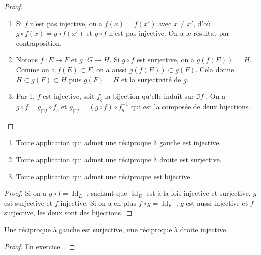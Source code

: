 \begin{proof}
\par\noindent
\begin{enumerate}
\item Si \(𝑓\) n'est pas injective, on a \(𝑓(𝑥)=𝑓(𝑥')\) avec \(𝑥≠𝑥'\),
d'où \(𝑔∘𝑓(𝑥)=𝑔∘𝑓(𝑥')\) et \(𝑔∘𝑓\)
n'est pas injective. On a le résultat par contraposition.
\item Notons \(𝑓~:𝐸→𝐹\) et \(𝑔~:𝐺→𝐻\). Si \(𝑔∘𝑓\) est surjective, on a \(𝑔(𝑓(𝐸))~=𝐻\).
Comme on a \(𝑓(𝐸)⊂𝐹\), on a aussi \(𝑔(𝑓(𝐸))⊂𝑔(𝐹)\).
Cela donne \(𝐻⊂𝑔(𝐹)⊂𝐻\) puis \(𝑔(𝐹)=𝐻\) et la surjectivité de \(𝑔\).
\item Par 1, \(𝑓\) est injective, soit \(𝑓_b\) la bijection qu'elle induit sur \(\Im 𝑓\) . On a \(𝑔∘𝑓=𝑔_{\left|\Im
𝑓\right.}∘𝑓_b\) et \(𝑔_{\left|\Im 𝑓\right.}=(𝑔∘𝑓)∘𝑓_b^{-1}\) qui est la composée de deux bijections.
\end{enumerate}
\end{proof}
%
\begin{theorem}
\begin{enumerate}
\item Toute application qui admet une réciproque à gauche est injective.
\item Toute application qui admet une réciproque à droite est surjective.
\item Toute application qui admet une réciproque est bijective.
\end{enumerate}
\end{theorem}
\begin{proof}
Si on a \(𝑔∘𝑓=\operatorname{Id}_{𝐸}\) , sachant que \(\operatorname{Id}_{𝐸}\) est à la fois injective et surjective,
\(𝑔\) est surjective et \(𝑓\) injective. Si on a en plus \(𝑓∘𝑔=\operatorname{Id}_{𝐹}\) , \(𝑔\) est aussi injective et
 \(𝑓\) surjective, les deux sont des bijections.
\end{proof}
\begin{theorem}
Une réciproque à gauche est surjective, une réciproque à droite injective.
\end{theorem}
\begin{proof}
En exercice...
\end{proof}
